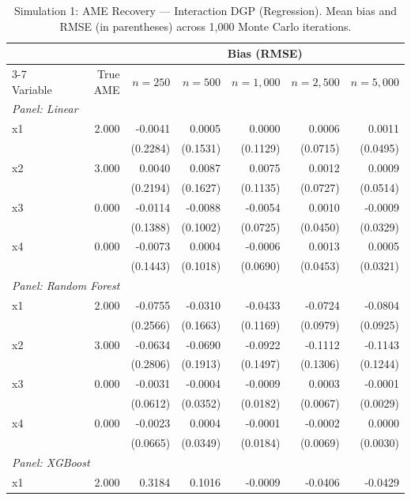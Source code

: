 \begin{table}[htbp]
\centering
\small
\begin{threeparttable}
\caption{Simulation 1: AME Recovery --- Interaction DGP (Regression). Mean bias and RMSE (in parentheses) across 1,000 Monte Carlo iterations.}
\label{tab:sim1_regression_interaction}
\begin{tabular}{lrrrrrr}
\toprule
 & & \multicolumn{5}{c}{Bias (RMSE)} \\
\cmidrule(lr){3-7}
Variable & True AME & $n=250$ & $n=500$ & $n=1,000$ & $n=2,500$ & $n=5,000$ \\
\midrule
\multicolumn{7}{l}{\textit{Panel: Linear}} \\
\quad x1 & 2.000 & -0.0041 & 0.0005 & 0.0000 & 0.0006 & 0.0011 \\
 &  & (0.2284) & (0.1531) & (0.1129) & (0.0715) & (0.0495) \\
\quad x2 & 3.000 & 0.0040 & 0.0087 & 0.0075 & 0.0012 & 0.0009 \\
 &  & (0.2194) & (0.1627) & (0.1135) & (0.0727) & (0.0514) \\
\quad x3 & 0.000 & -0.0114 & -0.0088 & -0.0054 & 0.0010 & -0.0009 \\
 &  & (0.1388) & (0.1002) & (0.0725) & (0.0450) & (0.0329) \\
\quad x4 & 0.000 & -0.0073 & 0.0004 & -0.0006 & 0.0013 & 0.0005 \\
 &  & (0.1443) & (0.1018) & (0.0690) & (0.0453) & (0.0321) \\
\midrule
\multicolumn{7}{l}{\textit{Panel: Random Forest}} \\
\quad x1 & 2.000 & -0.0755 & -0.0310 & -0.0433 & -0.0724 & -0.0804 \\
 &  & (0.2566) & (0.1663) & (0.1169) & (0.0979) & (0.0925) \\
\quad x2 & 3.000 & -0.0634 & -0.0690 & -0.0922 & -0.1112 & -0.1143 \\
 &  & (0.2806) & (0.1913) & (0.1497) & (0.1306) & (0.1244) \\
\quad x3 & 0.000 & -0.0031 & -0.0004 & -0.0009 & 0.0003 & -0.0001 \\
 &  & (0.0612) & (0.0352) & (0.0182) & (0.0067) & (0.0029) \\
\quad x4 & 0.000 & -0.0023 & 0.0004 & -0.0001 & -0.0002 & 0.0000 \\
 &  & (0.0665) & (0.0349) & (0.0184) & (0.0069) & (0.0030) \\
\midrule
\multicolumn{7}{l}{\textit{Panel: XGBoost}} \\
\quad x1 & 2.000 & 0.3184 & 0.1016 & -0.0009 & -0.0406 & -0.0429 \\

\end{tabular}
\end{threeparttable}
\end{table}
